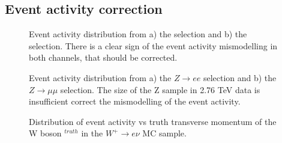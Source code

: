 \subsection{ Event activity correction}\label{sec:SumetCor}



\begin{figure}[!tbp]
\begin{minipage}[h]{0.49\linewidth}
\end{minipage}
\hfill
\begin{minipage}[h]{0.49\linewidth}
\end{minipage}
\caption{Event activity \sumet distribution from a) the \wenu selection and b) the \wmunu selection. There is a clear sign of the event activity mismodelling in both channels, that should be corrected.}
\label{HadrRecoil:UncorrSumet}
\end{figure}

\begin{figure}[!tbp]
\begin{minipage}[h]{0.49\linewidth}
\end{minipage}
\hfill
\begin{minipage}[h]{0.49\linewidth}
\end{minipage}
\caption{Event activity \sumet distribution from a) the $Z\to ee$ selection and b) the $Z\to \mu\mu$ selection. The size of the Z sample in 2.76 TeV data is insufficient correct the mismodelling of the event activity. }
\label{HadronRecoilSumetZ}
\end{figure}

\begin{figure}[!tb]
\caption{Distribution of event activity \sumet vs truth transverse momentum of the W boson \ptw$^{truth}$ in the $W^{+} \to e\nu$ MC sample.  }
\label{HadrRecoil:SumetPt}
\end{figure}




